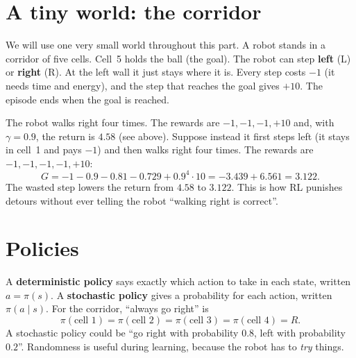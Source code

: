 \section*{A tiny world: the corridor}
We will use one very small world throughout this part. A robot stands in a corridor of five cells. Cell~5 holds the ball (the goal). The robot can step \textbf{left} (L) or \textbf{right} (R). At the left wall it just stays where it is. Every step costs $-1$ (it needs time and energy), and the step that reaches the goal gives $+10$. The episode ends when the goal is reached.

\begin{center}
\label{fig:rl1_corridor}
\end{center}

\begin{example}
The robot walks right four times. The rewards are $-1,-1,-1,+10$ and, with $\gamma=0.9$, the return is $4.58$ (see above). Suppose instead it first steps left (it stays in cell~1 and pays $-1$) and then walks right four times. The rewards are $-1,-1,-1,-1,+10$:
\[
G=-1-0.9-0.81-0.729+0.9^4\cdot 10=-3.439+6.561=3.122 .
\]
The wasted step lowers the return from $4.58$ to $3.122$. This is how RL punishes detours without ever telling the robot ``walking right is correct''.
\end{example}

\section*{Policies}
A \textbf{deterministic policy} says exactly which action to take in each state, written $a=\pi(s)$. A \textbf{stochastic policy} gives a probability for each action, written $\pi(a\mid s)$. For the corridor, ``always go right'' is
\[
\pi(\text{cell }1)=\pi(\text{cell }2)=\pi(\text{cell }3)=\pi(\text{cell }4)=R .
\]
A stochastic policy could be ``go right with probability $0.8$, left with probability $0.2$''. Randomness is useful during learning, because the robot has to \emph{try} things.

